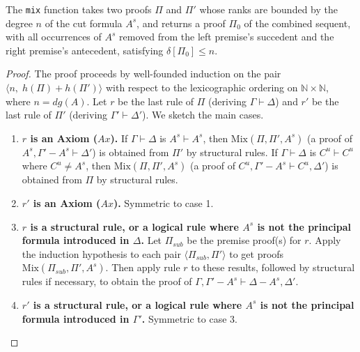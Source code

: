 \documentclass{article}
\newcommand{\seq}[2]{{#1} \vdash{} {#2}}
\newcommand{\pf}[2]{{#1}^{#2}} %
\newcommand{\cana}[1]{#1\!-\!\pf{A}{s}}
\theoremstyle{definition}
\begin{document}

\noindent
The \texttt{mix} function takes two proofs $\Pi$ and $\Pi'$ whose ranks are bounded by the degree $n$ of the cut formula $A^{s}$, and returns a proof $\Pi_0$ of the combined sequent, with all occurrences of $A^{s}$ removed from the left premise's succedent and the right premise's antecedent, satisfying $\delta[\Pi_0] \leq n$.


\begin{proof}
The proof proceeds by well-founded induction on the pair $\langle n,\; h(\Pi) + h(\Pi') \rangle$ with respect to the lexicographic ordering on $\mathbb{N} \times \mathbb{N}$, where $n = dg(A)$. Let $r$ be the last rule of $\Pi$ (deriving $\seq{\Gamma}{\Delta}$) and $r'$ be the last rule of $\Pi'$ (deriving $\seq{\Gamma'}{\Delta'}$). We sketch the main cases.
\begin{enumerate}
    \item \textbf{$r$ is an Axiom ($Ax$).}
        If $\seq{\Gamma}{\Delta}$ is $\seq{\pf{A}{s}}{\pf{A}{s}}$, then $\text{Mix}(\Pi, \Pi', \pf{A}{s})$ (a proof of $\seq{\pf{A}{s}, \cana{\Gamma'}}{\Delta'}$) is obtained from $\Pi'$ by structural rules.
        If $\seq{\Gamma}{\Delta}$ is $\seq{\pf{C}{u}}{\pf{C}{u}}$ where $\pf{C}{u} \neq \pf{A}{s}$, then $\text{Mix}(\Pi, \Pi', \pf{A}{s})$ (a proof of $\seq{\pf{C}{u}, \cana{\Gamma'}}{\pf{C}{u}, \Delta'}$) is obtained from $\Pi$ by structural rules.

    \item \textbf{$r'$ is an Axiom ($Ax$).} Symmetric to case 1.

    \item \textbf{$r$ is a structural rule, or a logical rule where $\pf{A}{s}$ is not the principal formula introduced in $\Delta$.}
        Let $\Pi_{sub}$ be the premise proof(s) for $r$. Apply the induction hypothesis to each pair $\langle \Pi_{sub}, \Pi' \rangle$ to get proofs $\text{Mix}(\Pi_{sub}, \Pi', \pf{A}{s})$. Then apply rule $r$ to these results, followed by structural rules if necessary, to obtain the proof of $\seq{\Gamma, \cana{\Gamma'}}{\cana{\Delta}, \Delta'}$.

    \item \textbf{$r'$ is a structural rule, or a logical rule where $\pf{A}{s}$ is not the principal formula introduced in $\Gamma'$.} Symmetric to case 3.


\end{enumerate}
\end{proof}
\end{document}
